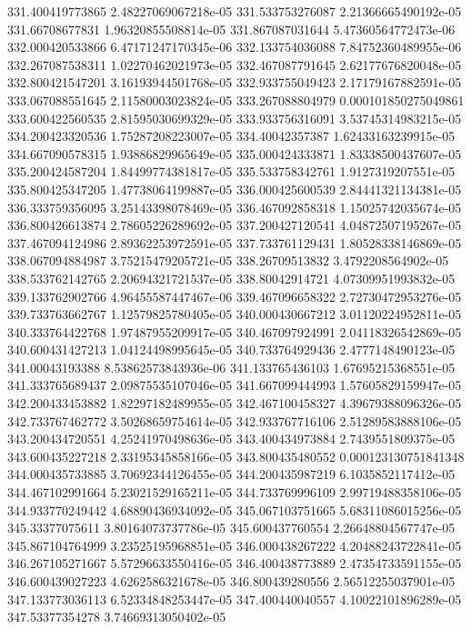 {331.400419773865 2.48227069067218e-05
331.533753276087 2.21366665490192e-05
331.66708677831 1.96320855508814e-05
331.867087031644 5.47360564772473e-06
332.000420533866 6.47171247170345e-06
332.133754036088 7.84752360489955e-06
332.267087538311 1.02270462021973e-05
332.467087791645 2.62177676820048e-05
332.800421547201 3.16193944501768e-05
332.933755049423 2.17179167882591e-05
333.067088551645 2.11580003023824e-05
333.267088804979 0.000101850275049861
333.600422560535 2.81595030699329e-05
333.933756316091 3.53745314983215e-05
334.200423320536 1.75287208223007e-05
334.40042357387 1.62433163239915e-05
334.667090578315 1.93886829965649e-05
335.000424333871 1.83338500437607e-05
335.200424587204 1.84499774381817e-05
335.533758342761 1.9127319207551e-05
335.800425347205 1.47738064199887e-05
336.000425600539 2.84441321134381e-05
336.333759356095 3.25143398078469e-05
336.467092858318 1.15025742035674e-05
336.800426613874 2.78605226289692e-05
337.200427120541 4.04872507195267e-05
337.467094124986 2.89362253972591e-05
337.733761129431 1.80528338146869e-05
338.067094884987 3.75215479205721e-05
338.26709513832 3.4792208564902e-05
338.533762142765 2.20694321721537e-05
338.80042914721 4.07309951993832e-05
339.133762902766 4.96455587447467e-06
339.467096658322 2.72730472953276e-05
339.733763662767 1.12579825780405e-05
340.000430667212 3.01120224952811e-05
340.333764422768 1.97487955209917e-05
340.467097924991 2.04118326542869e-05
340.600431427213 1.04124498995645e-05
340.733764929436 2.4777148490123e-05
341.00043193388 8.53862573843936e-06
341.133765436103 1.67695215368551e-05
341.333765689437 2.09875535107046e-05
341.667099444993 1.57605829159947e-05
342.200433453882 1.82297182489955e-05
342.467100458327 4.39679388096326e-05
342.733767462772 3.50268659754614e-05
342.933767716106 2.51289583888106e-05
343.200434720551 4.25241970498636e-05
343.400434973884 2.7439551809375e-05
343.600435227218 2.33195345858166e-05
343.800435480552 0.000123130751841348
344.000435733885 3.70692344126455e-05
344.200435987219 6.1035852117412e-05
344.467102991664 5.23021529165211e-05
344.733769996109 2.99719488358106e-05
344.933770249442 4.68890436934092e-05
345.067103751665 5.68311086015256e-05
345.33377075611 3.80164073737786e-05
345.600437760554 2.26648804567747e-05
345.867104764999 3.23525195968851e-05
346.000438267222 4.20488243722841e-05
346.267105271667 5.57296633550416e-05
346.400438773889 2.47354733591155e-05
346.600439027223 4.6262586321678e-05
346.800439280556 2.56512255037901e-05
347.133773036113 6.52334848253447e-05
347.400440040557 4.10022101896289e-05
347.53377354278 3.74669313050402e-05
}
